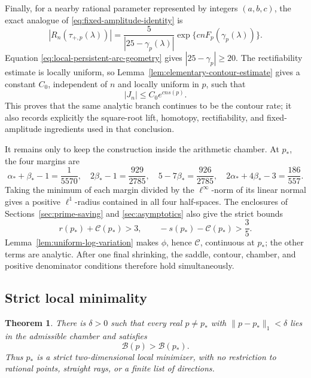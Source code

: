 \documentclass[11pt,reqno,letterpaper]{amsart}
\numberwithin{equation}{section}
\newtheorem{theorem}{Theorem}[section]
\theoremstyle{definition}
\theoremstyle{remark}
\begin{document}
Finally, for a nearby rational parameter represented by integers
\((a,b,c)\), the exact analogue of \eqref{eq:fixed-amplitude-identity} is
\begin{equation}\label{eq:local-uniform-amplitude}
 |R_n(\tau_{+,p}(\lambda))|
 =\frac5{|25-\gamma_p(\lambda)|}
   \exp\{cnF_p(\gamma_p(\lambda))\}.
\end{equation}
Equation \eqref{eq:local-persistent-arc-geometry} gives
\(|25-\gamma_p|\geq20\).  The rectifiability estimate is locally
uniform, so Lemma~\ref{lem:elementary-contour-estimate} gives a constant
\(C_0\), independent of \(n\) and locally uniform in \(p\), such that
\begin{equation}\label{eq:local-uniform-integral-bound}
 |J_n|\leq C_0e^{cns(p)}.
\end{equation}
This proves that the same analytic branch continues to be the contour
rate; it also records explicitly the square-root lift, homotopy,
rectifiability, and fixed-amplitude ingredients used in that conclusion.

It remains only to keep the construction inside the arithmetic chamber.
At \(p_*\), the four margins are
\begin{equation}\label{eq:local-chamber-margins}
 \alpha_*+\beta_*-1=\frac1{5570},\quad
 2\beta_*-1=\frac{929}{2785},\quad
 5-7\beta_*=\frac{926}{2785},\quad
 2\alpha_*+4\beta_*-3=\frac{186}{557}.
\end{equation}
Taking the minimum of each margin divided by the \(\ell^\infty\)-norm of
its linear normal gives a positive \(\ell^1\)-radius contained in all
four half-spaces.  The enclosures of Sections~\ref{sec:prime-saving}
and \ref{sec:asymptotics} also give the strict bounds
\begin{equation}\label{eq:local-positive-rate-margins}
 r(p_*)+\mathcal C(p_*)>3,\qquad
 -s(p_*)-\mathcal C(p_*)>\frac35.
\end{equation}
Lemma~\ref{lem:uniform-log-variation} makes \(\phi\), hence
\(\mathcal C\), continuous at \(p_*\); the other terms are analytic.
After one final shrinking, the saddle, contour, chamber, and positive
denominator conditions therefore hold simultaneously.

\subsection{Strict local minimality}

\begin{theorem}\label{thm:local-minimum-detailed}
There is \(\delta>0\) such that every real \(p\ne p_*\) with
\(\|p-p_*\|_1<\delta\) lies in the admissible chamber and satisfies
\[
 \mathcal B(p)>\mathcal B(p_*).
\]
Thus \(p_*\) is a strict two-dimensional local minimizer, with no
restriction to rational points, straight rays, or a finite list of
directions.
\end{theorem}
\end{document}
